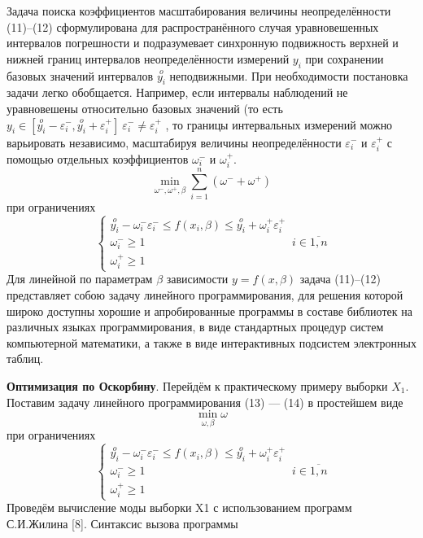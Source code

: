 \documentclass[a4paper,14pt]{article}
\begin{document}
	Задача поиска коэффициентов масштабирования величины неопределённости (11)–(12) сформулирована для распространённого случая уравновешенных
	интервалов погрешности и подразумевает синхронную подвижность верхней и
	нижней границ интервалов неопределённости измерений $y_i$ при сохранении базовых значений интервалов $\stackrel{o}{y_i}$ неподвижными. При необходимости постановка задачи легко обобщается. Например, если интервалы наблюдений не уравновешены относительно базовых значений (то есть $y_i \in [\stackrel{o}{y_i} - \varepsilon_i^{-}, \stackrel{o}{y_i} + \varepsilon_i^{+}] \ \varepsilon_i^{-}\neq\varepsilon_i^{+}$ , то
	границы интервальных измерений можно варьировать независимо, масштабируя величины неопределённости $\varepsilon_i^{-}$ и $\varepsilon_i^{+}$
	с помощью отдельных коэффициентов $\omega_i^{-}$ и $\omega_i^{+}$.
	\begin{equation}
		\min_{\omega^{-}, \omega^{+}, \beta} \sum_{i=1}^{n} (\omega^{-} + \omega^{+})
	\end{equation}
	при ограничениях
	\begin{equation}
		\begin{cases}
			\stackrel{o}{y_i} - \omega_i^{-}\varepsilon_i^{-} \leq f(x_i, \beta) \leq \stackrel{o}{y_i} + \omega_i^{+}\varepsilon_i^{+}\\
			\omega_i^{-} \geq 1\\
			\omega_i^{+} \geq 1
		\end{cases}\, i \in \overline{1,n}
	\end{equation}
	Для линейной по параметрам $\beta$ зависимости $y = f(x, \beta)$ задача (11)–(12)
	представляет собою задачу линейного программирования, для решения которой
	широко доступны хорошие и апробированные программы в составе библиотек
	на различных языках программирования, в виде стандартных процедур систем компьютерной математики, а также в виде интерактивных подсистем электронных таблиц.
	
	\textbf{Оптимизация по Оскорбину}. Перейдём к практическому примеру выборки
	$X_1$. Поставим задачу линейного программирования (13) — (14) в простейшем
	виде
	\begin{equation}
		\min_{\omega, \beta} \omega
	\end{equation}
	при ограничениях
	\begin{equation}
		\begin{cases}
			\stackrel{o}{y_i} - \omega_i^{-}\varepsilon_i^{-} \leq f(x_i, \beta) \leq \stackrel{o}{y_i} + \omega_i^{+}\varepsilon_i^{+}\\
			\omega_i^{-} \geq 1\\
			\omega_i^{+} \geq 1
		\end{cases}\, i \in \overline{1,n}
	\end{equation}
	Проведём вычисление моды выборки X1 с использованием программ С.И.Жилина [8]. Синтаксис вызова программы
	
\end{document}
